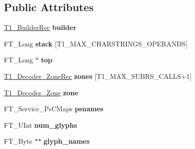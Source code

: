 \subsection*{Public Attributes}
\begin{DoxyCompactItemize}
\item 
\mbox{\label{structT1__DecoderRec___a75fd9f539974efe45107ce602dc9ea1b}} 
\hyperlink{structT1__BuilderRec__}{T1\+\_\+\+Builder\+Rec} {\bfseries builder}
\item 
\mbox{\label{structT1__DecoderRec___a6701703a099d63cb43a4cd7927313529}} 
F\+T\+\_\+\+Long {\bfseries stack} \mbox{[}T1\+\_\+\+M\+A\+X\+\_\+\+C\+H\+A\+R\+S\+T\+R\+I\+N\+G\+S\+\_\+\+O\+P\+E\+R\+A\+N\+DS\mbox{]}
\item 
\mbox{\label{structT1__DecoderRec___a39807fc1cb20575ea87808afbd485f86}} 
F\+T\+\_\+\+Long $\ast$ {\bfseries top}
\item 
\mbox{\label{structT1__DecoderRec___a98b458dc4018df19fce7c63d4e5bd4ea}} 
\hyperlink{structT1__Decoder__ZoneRec__}{T1\+\_\+\+Decoder\+\_\+\+Zone\+Rec} {\bfseries zones} \mbox{[}T1\+\_\+\+M\+A\+X\+\_\+\+S\+U\+B\+R\+S\+\_\+\+C\+A\+L\+LS+1\mbox{]}
\item 
\mbox{\label{structT1__DecoderRec___add29399f0c811404b9d6ca373793103e}} 
\hyperlink{structT1__Decoder__ZoneRec__}{T1\+\_\+\+Decoder\+\_\+\+Zone} {\bfseries zone}
\item 
\mbox{\label{structT1__DecoderRec___ac1c3efd334618c670c6e2b975829e926}} 
F\+T\+\_\+\+Service\+\_\+\+Ps\+C\+Maps {\bfseries psnames}
\item 
\mbox{\label{structT1__DecoderRec___a1ae08137c5931f34db9c3bb864b17712}} 
F\+T\+\_\+\+U\+Int {\bfseries num\+\_\+glyphs}
\item 
\mbox{\label{structT1__DecoderRec___a9fb54284511503a4845b2a5bce5bdc4a}} 
F\+T\+\_\+\+Byte $\ast$$\ast$ {\bfseries glyph\+\_\+names}
\item 
\mbox{\label{structT1__DecoderRec___ae462a9834f9196cec6b51bb651409a04}} 
$$
\end{DoxyCompactItemize}
